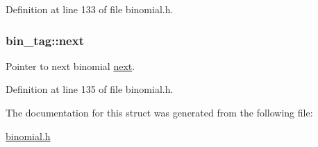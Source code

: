 Definition at line 133 of file binomial.\-h.

\hypertarget{structbin__tag_a980eb5c7885afd0a14c4f30db7272c4e}{
\subsubsection[{next}]{ bin\-\_\-tag\-::next}}\label{structbin__tag_a980eb5c7885afd0a14c4f30db7272c4e}
Pointer to next binomial \hyperlink{structbin__tag_a980eb5c7885afd0a14c4f30db7272c4e}{next}. 

Definition at line 135 of file binomial.\-h.



The documentation for this struct was generated from the following file\-:\begin{DoxyCompactItemize}
\item 
\hyperlink{binomial_8h}{binomial.\-h}\end{DoxyCompactItemize}
